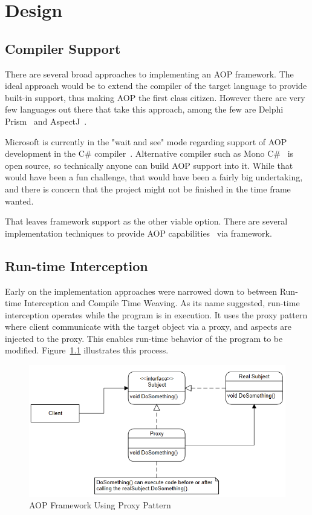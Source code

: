 \chapter{Design}

\section{Compiler Support}

There are several broad approaches to implementing an AOP framework. The ideal approach would be to extend the compiler of the target language to provide built-in support, thus making AOP the first class citizen. However there are very few languages out there that take this approach, among the few are Delphi Prism~\cite{delphi_prism2010} and AspectJ~\cite{aspectj_faq, aspectj_text}. 

Microsoft is currently in the "wait and see" mode regarding support of AOP development in the C\# compiler~\cite{hejlsberg}. Alternative compiler such as Mono C\#~\cite{monocsharp} is open source, so technically anyone can build AOP support into it. While that would have been a fun challenge, that would have been a fairly big undertaking, and there is concern that the project might not be finished in the time frame wanted.

That leaves framework support as the other viable option. There are several implementation techniques to provide AOP capabilities~\cite{aopcs, postsharp, aspectcs} via framework.

\section{Run-time Interception}

Early on the implementation approaches were narrowed down to between Run-time Interception and Compile Time Weaving. As its name suggested, run-time interception operates while the program is in execution. It uses the proxy pattern where client communicate with the target object via a proxy, and aspects are injected to the proxy. This enables run-time behavior of the program to be modified. Figure~\ref{proxy_model} illustrates this process.

\begin{figure}[H]
  \includegraphics[scale=1.0]{Proxy3.PNG}
  \centering
  \caption{AOP Framework Using Proxy Pattern\label{proxy_model}}
\end{figure}

